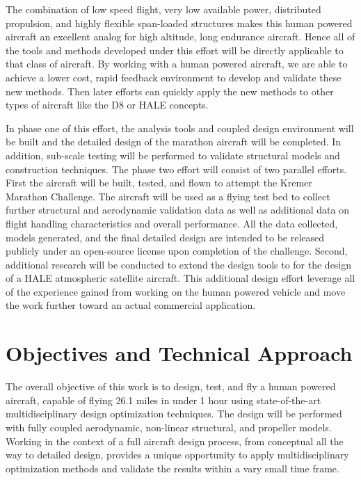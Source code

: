 \documentclass[]{aiaa-tc}
\begin{document}
    The combination of low speed flight, very low available power, distributed propulsion, and highly 
    flexible span-loaded structures makes this human powered aircraft an excellent analog for 
    high altitude, long endurance aircraft. Hence all of the tools and methods developed under 
    this effort will be directly applicable to that class of aircraft. By working with a human powered 
    aircraft, we are able to achieve a lower cost, rapid feedback environment to develop and validate these 
    new methods. Then later efforts can quickly apply the new methods to other types of aircraft like the D8
    or HALE concepts. 

    In phase one of this effort, the analysis tools and coupled design environment will be built and 
    the detailed design of the marathon aircraft will be completed. In addition, sub-scale testing will be 
    performed to validate structural models and construction techniques. The phase two effort will consist of two 
    parallel efforts. First the aircraft will be built, tested, and flown to attempt the Kremer Marathon Challenge. 
    The aircraft will be used as a flying test bed to collect further structural and aerodynamic validation data as well 
    as additional data on flight handling characteristics and overall performance. All the data collected, 
    models generated, and the final detailed design are intended to be released publicly under an open-source license
    upon completion of the challenge. Second, additional research will be conducted to extend the design tools to 
    for the design of a HALE atmospheric satellite aircraft. This additional design effort leverage all of the experience 
    gained from working on the human powered vehicle and move the work further toward an actual commercial application. 


  \section{Objectives and Technical Approach}

    The overall objective of this work is to design, test, and fly a human powered aircraft, 
    capable of flying 26.1 miles in under 1 hour using state-of-the-art multidisciplinary 
    design optimization techniques. The design will be performed with fully coupled
    aerodynamic, non-linear structural, and propeller models. Working in the context of 
    a full aircraft design process, from conceptual all the way to detailed design, 
    provides a unique opportunity to apply multidisciplinary optimization methods and validate
    the results within a vary small time frame. 
\end{document}
